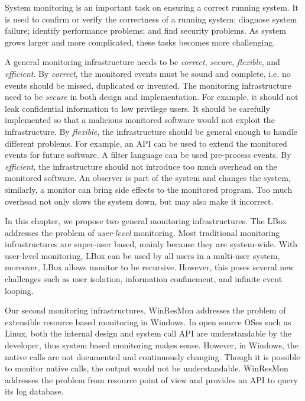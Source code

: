 
System monitoring is an important task on ensuring a correct running
system.
It is used to confirm or verify the correctness of a running system;
diagnose system failure;
identify performance problems;
and find security problems.
As system grows larger and more complicated, these tasks becomes more challenging.

A general monitoring infrastructure needs to be
{\em correct}, {\em secure}, {\em flexible}, and {\em efficient}.
By {\em correct}, the monitored events must be sound and complete, i.e.
no events should be missed, duplicated or invented.
The monitoring infrastructure need to be {\em secure} in both design and implementation.
For example, it should not leak confidential information to low privilege users.
It should be carefully implemented so that a malicious monitored
software would not exploit the infrastructure.
By {\em flexible}, the infrastructure should be general enough to
handle different problems.
For example, an API can be used to extend the monitored events for future software.
A filter language can be used pre-process events.
By {\em efficient}, the infrastructure should not introduce too much
overhead on the monitored software.
An observer is part of the system and changes the system, similarly,
a monitor can bring side effects to the monitored program.
Too much overhead not only slows the system down, but may also make
it incorrect.

In this chapter, we propose two general monitoring infrastructures.
The LBox addresses the problem of {\em user-level} monitoring.
Most traditional monitoring infrastructures are super-user based,
mainly because they are system-wide.
With user-level monitoring, LBox can be used by all users in a multi-user
system, moreover, LBox allows monitor to be recursive.
However, this poses several new challenges such as
user isolation, information confinement, and infinite event looping.

Our second monitoring infrastructures, WinResMon addresses the problem
of extensible resource based monitoring in Windows.
In open source OSes such as Linux,
both the internal design and system call API are understandable by
the developer, thus system based monitoring makes sense.
However, in Windows, the native calls are not documented and continuously
changing.
Though it is possible to monitor native calls, the output would not be
understandable.
WinResMon addresses the problem from resource point of view and
provides an API to query its log database.
